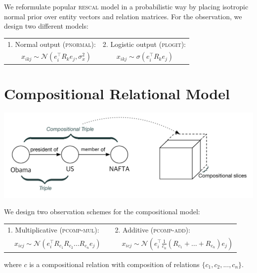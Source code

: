 \documentclass[a0,landscape]{a0poster}
\begin{document}
\begin{multicols}{3}
We reformulate popular \textsc{rescal} model in a probabilistic way by placing isotropic normal prior over entity vectors and relation matrices. For the observation, we design two different models:

\begin{center}
\begin{tabular}{p{.5\linewidth}p{.45\linewidth}}
 1. Normal output (\textsc{pnormal}):&
 2. Logistic output (\textsc{plogit}):\\
 $\quad\quad x_{ikj} \sim \mathcal{N}(e_i^\top R_k e_j, \sigma_x^2)$
&
 $\quad\quad x_{ikj} \sim \sigma(e_i^\top R_k e_j)$
\end{tabular}
\end{center}

\section{Compositional Relational Model}
\begin{center}
\includegraphics[width=.9\linewidth]{./figures/composition.pdf}
\end{center}

\noindent We design two observation schemes for the compositional model:

\begin{center}
\begin{tabular}{l l}
1. Multiplicative {\small(\textsc{pcomp-mul})}:
&
$\quad$2. Additive {\small(\textsc{pcomp-add})}:\\
$\quad x_{icj} \sim \mathcal{N}(e_i^\top R_{c_1} R_{c_2} \dots R_{c_n} e_j)$
&
$\quad\quad x_{icj} \sim \mathcal{N}(e_i^\top \frac{1}{c_n} (R_{c_1} + \dots + R_{c_n}) e_j)$
\end{tabular}
\end{center}
where $c$ is a compositional relation with composition of relations $\{c_1, c_2, ..., c_n\}$.


\end{multicols}
\end{document}
